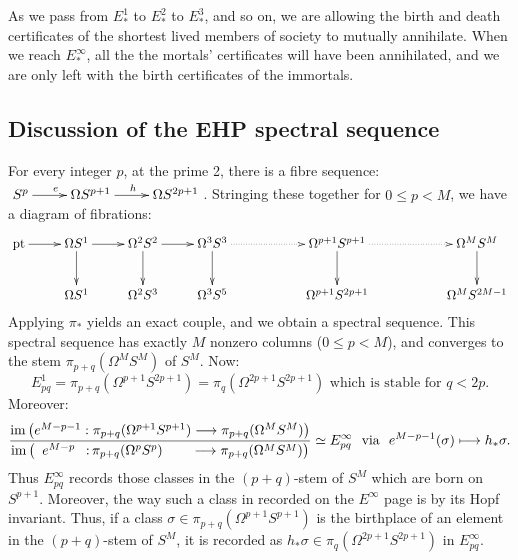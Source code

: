 \documentclass[11pt]{article}
\newcommand{\myheading}[1]
{{\noindent\Large #1}

}
\renewcommand{\myheading}[1]{\subsection{#1}}
\begin{document}
As we pass from $E_*^1$ to $E_*^2$ to $E_*^3$, and so on, we are allowing the
birth and death certificates of the shortest lived members of society to
mutually annihilate. When we reach $E_*^\infty$, all the the mortals'
certificates will have been annihilated, and we are only left with the birth
certificates of the immortals.
%


\myheading{Discussion of the EHP spectral sequence}
For every integer $p$, at the prime 2, there is a fibre sequence: $\xymatrix{S^p\ar[r]^e&\Omega S^{p+1}\ar[r]^h& \Omega S^{2p+1}}$. Stringing these together for $0\leq p<M$, we have a diagram of fibrations:
\[\xymatrix{
\textup{pt}\ar[r]&\Omega S^1\ar[d]\ar[r]&\Omega^2 S^2\ar[d]\ar[r]&\Omega^3 S^3\ar[d]\ar@{.>}[rr]&&\Omega^{p+1}S^{p+1}\ar[d]\ar@{.>}[rr]&&\Omega^{M}S^{M}\ar[d]\\
&\Omega S^1&\Omega^2 S^3& \Omega^3S^5&&\Omega^{p+1}S^{2p+1}&&\Omega^{M}S^{2M-1}
}\]
Applying $\pi_*$ yields an exact couple, and we obtain a spectral sequence. This spectral sequence has exactly $M$ nonzero columns ($0\leq p <M$), and converges to the stem $\pi_{p+q}(\Omega^{M}S^{M})$ of $S^{M}$. Now:
\[E_{pq}^1=\pi_{p+q}(\Omega^{p+1}S^{2p+1})=\pi_q(\Omega^{2p+1}S^{2p+1})\text{ which is stable for $q< 2p$}.\]
Moreover:
\[
\frac{\im\left(e^{M-p-1}:\pi_{p+q}(\Omega^{p+1}S^{p+1})\to\pi_{p+q}(\Omega^MS^M)\right)}
{\im\left(\phantom{e^{M-p-1}:}\makebox[0cm][r]{$e^{M-p}\,\ :$}
\,\makebox[0cm][l]{$\pi_{p+q}(\Omega^{p}S^{p})$}\phantom{\pi_{p+q}(\Omega^{p+1}S^{p+1})}
\to\pi_{p+q}(\Omega^MS^M)\right)}\simeq E_{pq}^\infty\text{\ \ via \ }e^{M-p-1}(\sigma)\mapsto h_*\sigma.\]%
Thus $E^\infty_{pq}$ records those classes in the $(p+q)$-stem of $S^M$ which are born on $S^{p+1}$. Moreover, the way such a class in recorded on the $E^\infty$ page is by its Hopf invariant. Thus, if a class $\sigma\in\pi_{p+q}(\Omega^{p+1}S^{p+1})$ is the birthplace of an element in the $(p+q)$-stem of $S^M$, it is recorded as $h_*\sigma\in\pi_q({\Omega^{2p+1}S^{2p+1}})$ in $E^\infty_{pq}$.
\end{document}
